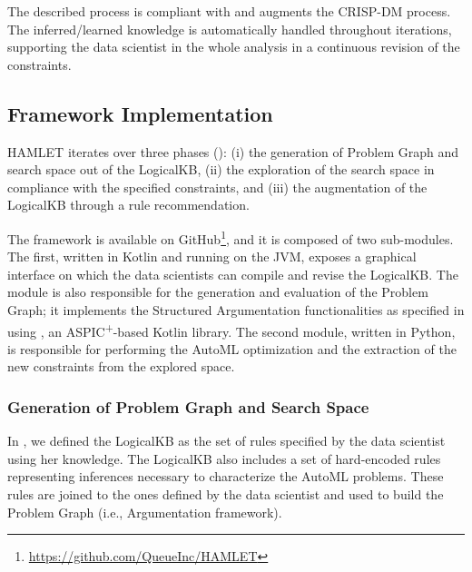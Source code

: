 The described process is compliant with and augments the CRISP-DM process.
The inferred/learned knowledge is automatically handled throughout iterations, supporting the data scientist in the whole analysis in a continuous revision of the constraints.
\vspace{2cm}

\subsection{Framework Implementation}\label{hamlet-ssec:implementation}

HAMLET iterates over three phases (): (i) the generation of Problem Graph and search space out of the LogicalKB, (ii) the exploration of the search space in compliance with the specified constraints, and (iii) the augmentation of the LogicalKB through a rule recommendation.

The framework is available on GitHub\footnote{\url{https://github.com/QueueInc/HAMLET}}, and it is composed of two sub-modules.
The first, written in Kotlin and running on the JVM, exposes a graphical interface on which the data scientists can compile and revise the LogicalKB.
The module is also responsible for the generation and evaluation of the Problem Graph; it implements the Structured Argumentation functionalities as specified in  using \argtup{} \cite{arg2p-jlc}, an ASPIC\textsuperscript{+}-based Kotlin library.
The second module, written in Python, is responsible for performing the AutoML optimization and the extraction of the new constraints from the explored space.

\subsubsection{Generation of Problem Graph and Search Space}
In , we defined the LogicalKB as the set of rules specified by the data scientist using her knowledge.
The LogicalKB also includes a set of hard-encoded rules representing inferences necessary to characterize the AutoML problems.
These rules are joined to the ones defined by the data scientist and used to build the Problem Graph (i.e., Argumentation framework).

